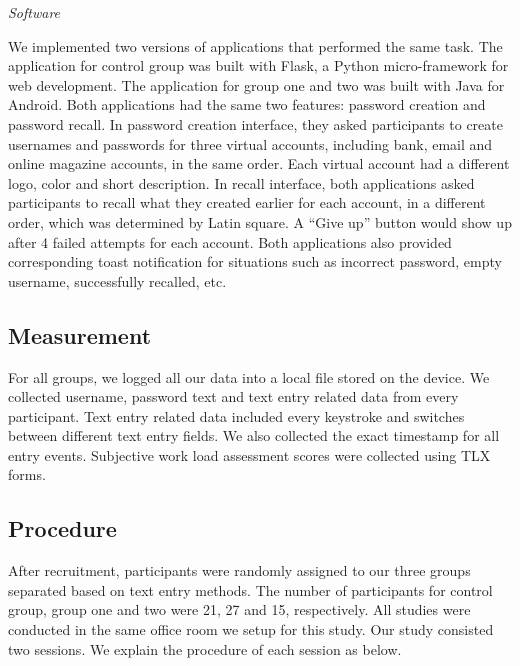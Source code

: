 \documentclass[conference]{IEEEtran}
\begin{document}
\textit{Software}

We implemented two versions of applications that performed the same task. The application for control group was built with Flask, a Python micro-framework for web development. The application for group one and two was built with Java for Android. Both applications had the same two features: password creation and password recall. In password creation interface, they asked participants to create usernames and passwords for three virtual accounts, including bank, email and online magazine accounts, in the same order. Each virtual account had a different logo, color and short description. In recall interface, both applications asked participants to recall what they created earlier for each account, in a different order, which was determined by Latin square. A ``Give up'' button would show up after 4 failed attempts for each account. Both applications also provided corresponding toast notification for situations such as incorrect password, empty username, successfully recalled, etc. 


\subsection{Measurement}

For all groups, we logged all our data into a local file stored on the device. 
We collected username, password text and text entry related data from every participant. Text entry related data included every keystroke and switches between different text entry fields. We also collected the exact timestamp for all entry events. Subjective work load assessment scores were collected using TLX forms.


\subsection{Procedure}

After recruitment, participants were randomly assigned to our three groups separated based on text entry methods. The number of participants for control group, group one and two were 21, 27 and 15, respectively. All studies were conducted in the same office room we setup for this study. Our study consisted two sessions. We explain the procedure of each session as below.
\end{document}
